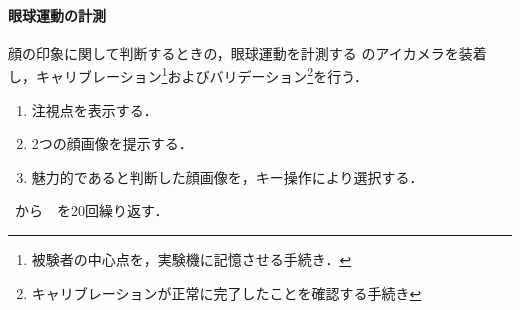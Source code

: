 \paragraph{眼球運動の計測}
顔の印象に関して判断するときの，眼球運動を計測する
\elt のアイカメラを装着し，キャリブレーション\footnote{被験者の中心点を，実験機に記憶させる手続き．}およびバリデーション\footnote{キャリブレーションが正常に完了したことを確認する手続き}を行う．
\begin{enumerate}
    \renewcommand{\labelenumi}{\fbox{\theenumi}}
    \item 注視点を表示する．
    \item 2つの顔画像を提示する．
    \item 魅力的であると判断した顔画像を，キー操作により選択する．
\end{enumerate}
\ から\ \ を20回繰り返す．
